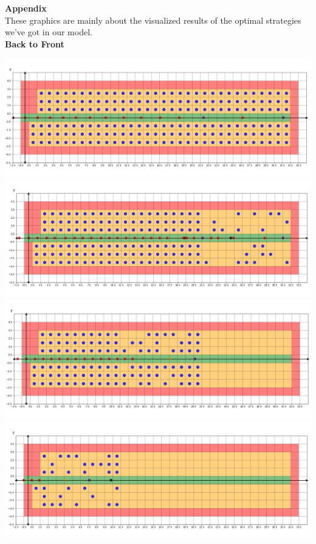 \documentclass{article}
\theoremstyle{definition}
\theoremstyle{remark}
\numberwithin{equation}{section}
\begin{document}
	\newpage
	\cleardoublepage
	\thispagestyle{empty}
	\renewcommand\refname{Appendix}
	\Huge \textbf{Appendix}
	\\[0.8cm]
	\normalsize These graphics are mainly about the visualized results of the optimal strategies we've got in our model.
	\\[2pt]
	\large \textbf{Back to Front}
	\begin{center}
		\includegraphics[width=14cm]{backtofront1.jpg}\\
		\includegraphics[width=14cm]{backtofront2.jpg}\\
		\includegraphics[width=14cm]{backtofront3.jpg}\\
		\clearpage
		\thispagestyle{empty}
		\includegraphics[width=14cm]{backtofront4.jpg}\\
	\end{center}
\end{document}
